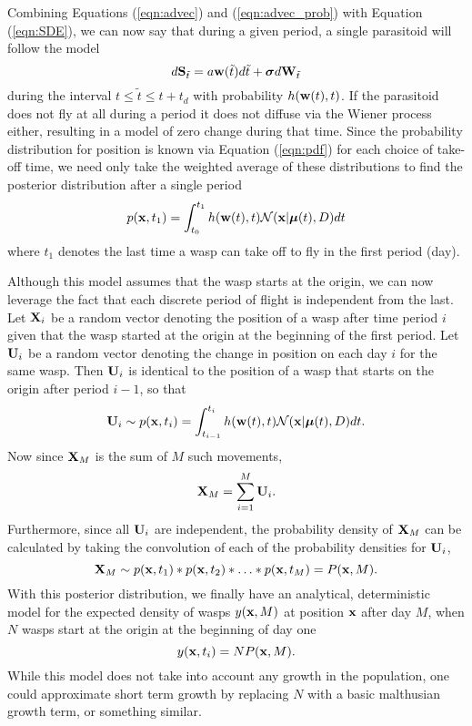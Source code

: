 \documentclass[12pt,english]{article}
\begin{document}
Combining Equations (\ref{eqn:advec}) and (\ref{eqn:advec_prob}) with Equation (\ref{eqn:SDE}), we can now say that during a given period, a single parasitoid will follow the model
\begin{equation*}
d\mathbf{S}_{\tilde{t}} = a\mathbf{w}(\tilde{t})d\tilde{t} + \boldsymbol\sigma d\mathbf{W}_{\tilde{t}}
\end{equation*}
during the interval $t\leq\tilde{t}\leq t+t_d$ with probability $h(\mathbf{w}(t),t)$. If the parasitoid does not fly at all during a period it does not diffuse via the Wiener process either, resulting in a model of zero change during that time. Since the probability distribution for position is known via Equation (\ref{eqn:pdf}) for each choice of take-off time, we need only take the weighted average of these distributions to find the posterior distribution after a single period
\begin{equation}
p(\mathbf{x},t_1) = \int_{t_0}^{t_1}h(\mathbf{w}(t),t)\mathcal{N}(\mathbf{x}|\boldsymbol\mu(t),D)dt\label{eqn:first_post}
\end{equation}
where $t_1$ denotes the last time a wasp can take off to fly in the first period (day).

Although this model assumes that the wasp starts at the origin, we can now leverage the fact that each discrete period of flight is independent from the last. Let $\mathbf{X}_i$ be a random vector denoting the position of a wasp after time period $i$ given that the wasp started at the origin at the beginning of the first period. Let $\mathbf{U}_i$ be a random vector denoting the change in position on each day $i$ for the same wasp. Then $\mathbf{U}_i$ is identical to the position of a wasp that starts on the origin after period $i-1$, so that
\begin{equation}
\mathbf{U}_i \sim p(\mathbf{x},t_i) = \int_{t_{i-1}}^{t_i}h(\mathbf{w}(t),t)\mathcal{N}(\mathbf{x}|\boldsymbol\mu(t),D)dt.
\end{equation}
Now since $\mathbf{X}_M$ is the sum of $M$ such movements,
\begin{equation*}
\mathbf{X}_M = \sum_{i=1}^M \mathbf{U}_i.
\end{equation*}
Furthermore, since all $\mathbf{U}_i$ are independent, the probability density of $\mathbf{X}_M$ can be calculated by taking the convolution of each of the probability densities for $\mathbf{U}_i$,
\begin{equation}
\mathbf{X}_M \sim p(\mathbf{x},t_1)\ast p(\mathbf{x},t_2)\ast\ldots\ast p(\mathbf{x},t_M) = P(\mathbf{x},M).
\end{equation}
With this posterior distribution, we finally have an analytical, deterministic model for the expected density of wasps $y(\mathbf{x},M)$ at position $\mathbf{x}$ after day $M$, when $N$ wasps start at the origin at the beginning of day one
\begin{equation*}
y(\mathbf{x},t_i) = NP(\mathbf{x},M).
\end{equation*}
While this model does not take into account any growth in the population, one could approximate short term growth by replacing $N$ with a basic malthusian growth term, or something similar.
\end{document}
